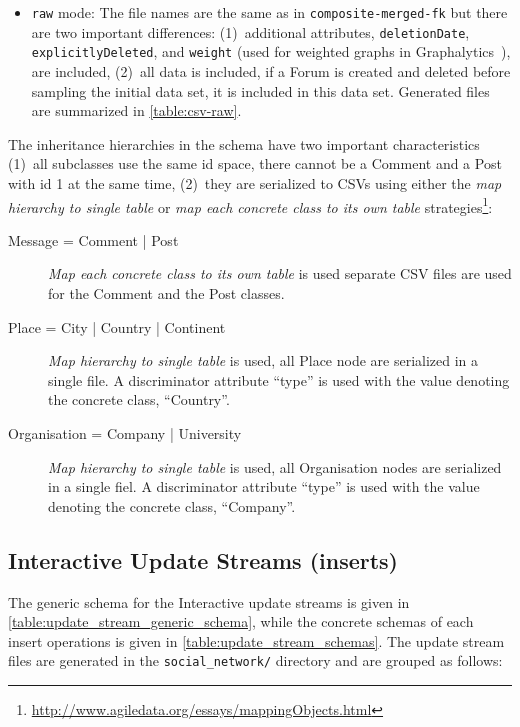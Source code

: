 \begin{itemize}
      \item \texttt{raw} mode:
      The file names are the same as in \texttt{composite-merged-fk} but there are two important differences:
      (1)~additional attributes, \eg \texttt{deletionDate}, \texttt{explicitlyDeleted}, and \texttt{weight} (used for weighted graphs in Graphalytics~\cite{DBLP:journals/corr/abs-2011-15028}), are included,
      (2)~all data is included, \ie if a Forum is created and deleted before sampling the initial data set, it is included in this data set.
      Generated files are summarized in \autoref{table:csv-raw}.
    \end{itemize}

The inheritance hierarchies in the schema have two important characteristics
(1)~all subclasses use the same id space, \eg there cannot be a Comment and a Post with id 1 at the same time,
(2)~they are serialized to CSVs using either the \emph{map hierarchy to single table} or \emph{map each concrete class to its own table} strategies\footnote{\url{http://www.agiledata.org/essays/mappingObjects.html}}:

\begin{description}
    \item[Message = Comment | Post]
    \emph{Map each concrete class to its own table} is used \ie separate CSV files are used for the Comment and the Post classes.

    \item[Place = City | Country | Continent]
    \emph{Map hierarchy to single table} is used, \ie all Place node are serialized in a single file. A discriminator attribute ``type'' is used with the value denoting the concrete class, \eg ``Country''.

    \item[Organisation = Company | University]
    \emph{Map hierarchy to single table} is used, \ie all Organisation nodes are serialized in a single fiel. A discriminator attribute ``type'' is used with the value denoting the concrete class, \eg ``Company''.
\end{description}

\subsection{Interactive Update Streams (inserts)}

The generic schema for the Interactive update streams is given in \autoref{table:update_stream_generic_schema}, while the concrete schemas of each insert operations is given in \autoref{table:update_stream_schemas}.
The update stream files are generated in the \texttt{social\_network/} directory and are grouped as follows:

